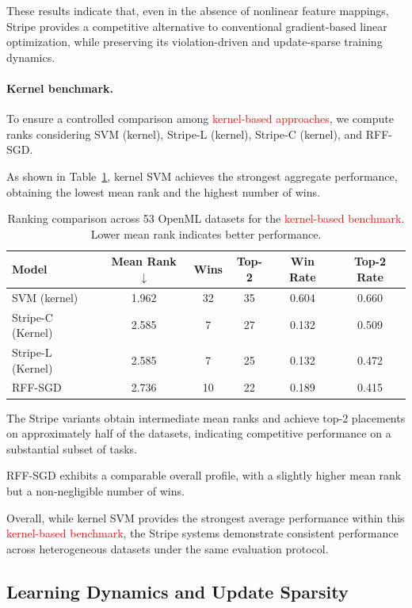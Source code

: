 \documentclass[a4paper,fleqn]{cas-sc}
\begin{document}
These results indicate that, even in the absence of nonlinear feature mappings,
Stripe provides a competitive alternative to conventional gradient-based linear optimization, while preserving its violation-driven and update-sparse training dynamics.

\paragraph{Kernel benchmark.}

To ensure a controlled comparison among \textcolor{red}{kernel-based approaches},
we compute ranks considering SVM (kernel),
Stripe-L (kernel), Stripe-C (kernel), and RFF-SGD.

As shown in Table~\ref{tab:rank_kernel},
kernel SVM achieves the strongest aggregate performance,
obtaining the lowest mean rank and the highest number of wins.

\begin{table}[t]
\centering
\caption{Ranking comparison across 53 OpenML datasets for the \textcolor{red}{kernel-based benchmark}. Lower mean rank indicates better performance.}
\label{tab:rank_kernel}
\begin{tabular}{lccccc}
\toprule
Model & Mean Rank $\downarrow$ & Wins & Top-2 & Win Rate & Top-2 Rate \\
\midrule
SVM (kernel)        & 1.962 & 32 & 35 & 0.604 & 0.660 \\
Stripe-C (Kernel)     & 2.585 &  7 & 27 & 0.132 & 0.509 \\
Stripe-L (Kernel)     & 2.585 &  7 & 25 & 0.132 & 0.472 \\
RFF-SGD             & 2.736 & 10 & 22 & 0.189 & 0.415 \\
\bottomrule
\end{tabular}
\end{table}

The Stripe variants obtain intermediate mean ranks and
achieve top-2 placements on approximately half of the datasets,
indicating competitive performance on a substantial subset of tasks.

RFF-SGD exhibits a comparable overall profile,
with a slightly higher mean rank but a non-negligible number of wins.

Overall, while kernel SVM provides the strongest average performance
within this \textcolor{red}{kernel-based benchmark}, the Stripe systems demonstrate consistent performance across
heterogeneous datasets under the same evaluation protocol.

\subsection{Learning Dynamics and Update Sparsity}
\end{document}
